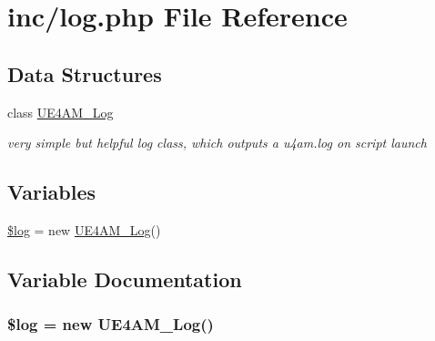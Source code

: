 \hypertarget{log_8php}{\section{inc/log.php File Reference}
\label{log_8php}
}
\subsection*{Data Structures}
\begin{DoxyCompactItemize}
\item 
class \hyperlink{class_u_e4_a_m___log}{U\-E4\-A\-M\-\_\-\-Log}
\begin{DoxyCompactList}\small\item\em very simple but helpful log class, which outputs a u4am.\-log on script launch \end{DoxyCompactList}\end{DoxyCompactItemize}
\subsection*{Variables}
\begin{DoxyCompactItemize}
\item 
\hyperlink{log_8php_a9a2cf15a653aee8be437f7ae474cd494}{\$log} = new \hyperlink{class_u_e4_a_m___log}{U\-E4\-A\-M\-\_\-\-Log}()
\end{DoxyCompactItemize}


\subsection{Variable Documentation}
\hypertarget{log_8php_a9a2cf15a653aee8be437f7ae474cd494}{
\subsubsection[{\$log}]{\setlength{\rightskip}{0pt plus 5cm}\$log = new {\bf U\-E4\-A\-M\-\_\-\-Log}()}}\label{log_8php_a9a2cf15a653aee8be437f7ae474cd494}
